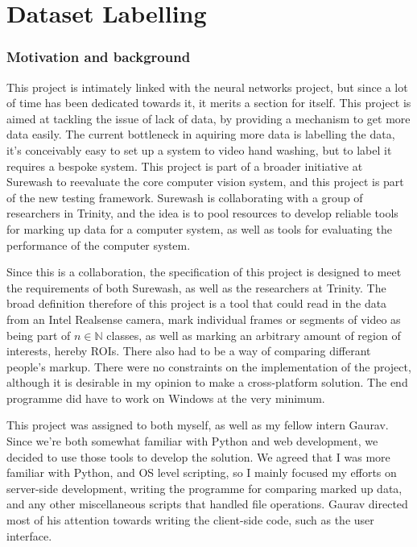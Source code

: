 \part{Dataset Labelling}
\section{Motivation and background}
This project is intimately linked with the neural networks project, but since a lot of time has been dedicated towards it, it merits a section for itself. This project is aimed at tackling the issue of lack of data, by providing a mechanism to get more data easily. The current bottleneck in aquiring more data is labelling the data, it's conceivably easy to set up a system to video hand washing, but to label it requires a bespoke system. This project is part of a broader initiative at Surewash to reevaluate the core computer vision system, and this project is part of the new testing framework. Surewash is collaborating with a group of researchers in Trinity, and the idea is to pool resources to develop reliable tools for marking up data for a computer system, as well as tools for evaluating the performance of the computer system.

Since this is a collaboration, the specification of this project is designed to meet the requirements of both Surewash, as well as the researchers at Trinity. The broad definition therefore of this project is a tool that could read in the data from an Intel Realsense camera, mark individual frames or segments of video as being part of $n \in \mathbb{N}$ classes, as well as marking an arbitrary amount of region of interests, hereby ROIs. There also had to be a way of comparing differant people's markup. There were no constraints on the implementation of the project, although it is desirable in my opinion to make a cross-platform solution. The end programme did have to work on Windows at the very minimum.

This project was assigned to both myself, as well as my fellow intern Gaurav. Since we're both somewhat familiar with Python and web development, we decided to use those tools to develop the solution. We agreed that I was more familiar with Python, and OS level scripting, so I mainly focused my efforts on server-side development, writing the programme for comparing marked up data, and any other miscellaneous scripts that handled file operations. Gaurav directed most of his attention towards writing the client-side code, such as the user interface.

